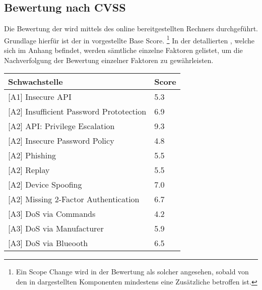 \subsection{Bewertung nach CVSS}
\label{sec:analysis_cvss}
    Die Bewertung der  wird mittels des online bereitgestellten Rechners\cite{CvssCalc} durchgeführt.
	Grundlage hierfür ist der in  vorgestellte Base Score.
	\footnote{Ein Scope Change wird in der Bewertung als solcher angesehen, sobald von den in  dargestellten Komponenten mindestens eine Zusätzliche betroffen ist.}
	In der detallierten , welche sich im Anhang befindet, werden sämtliche einzelne Faktoren gelistet, um die Nachverfolgung der Bewertung einzelner Faktoren zu gewährleisten.

    \begin{table}[H]
        \centering
        \sffamily
        \begin{tabular}{|l|l|}
        \hline
\textbf{Schwachstelle}                      & \textbf{Score} \\ \hline
\rowcolor{light-gray}
{[}A1{]} Insecure API                       & \cellcolor{orange}5.3            \\ \hline
{[}A2{]} Insufficient Password Prototection & \cellcolor{orange}6.9            \\ \hline
\rowcolor{light-gray}
{[}A2{]} API: Privilege Escalation          & \cellcolor{red}9.3            \\ \hline
{[}A2{]} Insecure Password Policy           & \cellcolor{orange}4.8            \\ \hline
\rowcolor{light-gray}
{[}A2{]} Phishing                           & \cellcolor{orange}5.5            \\ \hline
{[}A2{]} Replay                             & \cellcolor{orange}5.5            \\ \hline
\rowcolor{light-gray}
{[}A2{]} Device Spoofing                    & \cellcolor{redorange}7.0            \\ \hline
{[}A2{]} Missing 2-Factor Authentication    & \cellcolor{orange}6.7            \\ \hline
\rowcolor{light-gray}
{[}A3{]} DoS via Commands                   & \cellcolor{orange}4.2            \\ \hline
{[}A3{]} DoS via Manufacturer               & \cellcolor{orange}5.9            \\ \hline
\rowcolor{light-gray}
{[}A3{]} DoS via Blueooth                   & \cellcolor{orange}6.5            \\ \hline

\end{tabular}
\end{table}
